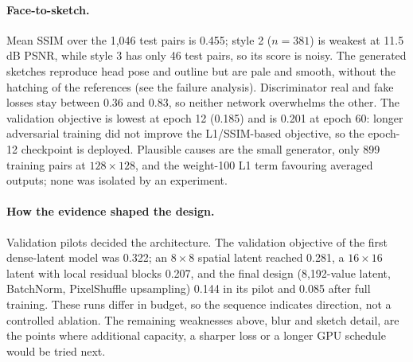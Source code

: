 \documentclass[conference]{IEEEtran}
\begin{document}
\paragraph{Face-to-sketch.} Mean SSIM over the 1,046 test pairs is 0.455; style 2 ($n=381$) is weakest at 11.5 dB PSNR, while style 3 has only 46 test pairs, so its score is noisy. The generated sketches reproduce head pose and outline but are pale and smooth, without the hatching of the references (see the failure analysis). 
Discriminator real and fake losses stay between 0.36 and 0.83, so neither network overwhelms the other. The validation objective is lowest at epoch 12 (0.185) and is 0.201 at epoch 60: longer adversarial training did not improve the L1/SSIM-based objective, so the epoch-12 checkpoint is deployed. 
Plausible causes are the small generator, only 899 training pairs at $128\times128$, and the weight-100 L1 term favouring averaged outputs; none was isolated by an experiment.

\paragraph{How the evidence shaped the design.} Validation pilots decided the architecture. The validation objective of the first dense-latent model was 0.322; an $8\times8$ spatial latent reached 0.281, a $16\times16$ latent with local residual blocks 0.207, and the final design (8,192-value latent, BatchNorm, PixelShuffle upsampling) 0.144 in its pilot and 0.085 after full training. These runs differ in budget, so the sequence indicates direction, not a controlled ablation. The remaining weaknesses above, blur and sketch detail, are the points where additional capacity, a sharper loss or a longer GPU schedule would be tried next.
\end{document}
